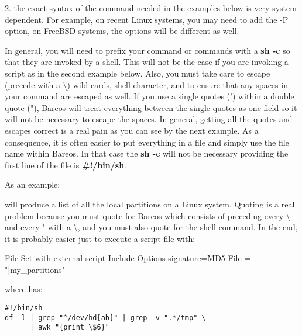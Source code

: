 \begin{description}
\begin{itemize}
   2.  the exact syntax of the command needed in the examples below is very
   system dependent.  For example, on recent Linux systems, you may need to
   add the -P option, on FreeBSD systems, the options will be different as
   well.

   In general, you will need to prefix your command or commands with a {\bf
   sh -c} so that they are invoked by a shell.  This will not be the case
   if you are invoking a script as in the second example below.  Also, you
   must take care to escape (precede with a \textbackslash{}) wild-cards,
   shell character, and to ensure that any spaces in your command are
   escaped as well.  If you use a single quotes (') within a double quote
   ("), Bareos will treat everything between the single quotes as one field
   so it will not be necessary to escape the spaces.  In general, getting
   all the quotes and escapes correct is a real pain as you can see by the
   next example.  As a consequence, it is often easier to put everything in
   a file and simply use the file name within Bareos.  In that case the
   {\bf sh -c} will not be necessary providing the first line of the file
   is {\bf \#!/bin/sh}.

   As an  example:

\hide{$}
   will produce a list of all the local partitions on a Linux system.
   Quoting is a real problem because you must quote for Bareos  which consists of
   preceding every \textbackslash{} and every " with a \textbackslash{}, and
   you must also quote for the shell command. In the end, it is probably  easier
   just to execute a script file with:

\begin{bconfig}{File Set with external script}
Include {
  Options {
    signature=MD5
  }
  File = "|my_partitions"
}
\end{bconfig}

   where  has:

\footnotesize
\begin{verbatim}
#!/bin/sh
df -l | grep "^/dev/hd[ab]" | grep -v ".*/tmp" \
      | awk "{print \$6}"
\end{verbatim}
\normalsize


\end{itemize}
\end{description}
